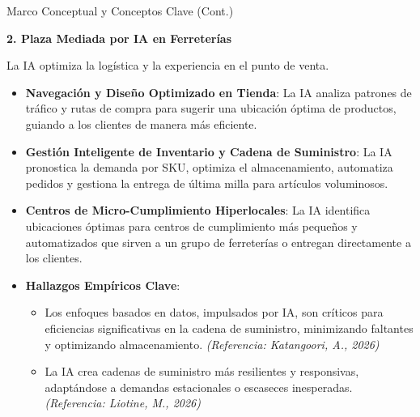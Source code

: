 \documentclass[aspectratio=169]{beamer}
\begin{document}
\begin{frame}{Marco Conceptual y Conceptos Clave (Cont.)}


\textbf{2. Plaza Mediada por IA en Ferreterías}

La IA optimiza la logística y la experiencia en el punto de venta.

\begin{itemize}
  \item \textbf{Navegación y Diseño Optimizado en Tienda}: La IA analiza patrones de tráfico y rutas de compra para sugerir una ubicación óptima de productos, guiando a los clientes de manera más eficiente.
  \item \textbf{Gestión Inteligente de Inventario y Cadena de Suministro}: La IA pronostica la demanda por SKU, optimiza el almacenamiento, automatiza pedidos y gestiona la entrega de última milla para artículos voluminosos.
  \item \textbf{Centros de Micro-Cumplimiento Hiperlocales}: La IA identifica ubicaciones óptimas para centros de cumplimiento más pequeños y automatizados que sirven a un grupo de ferreterías o entregan directamente a los clientes.
  \item \textbf{Hallazgos Empíricos Clave}:
  \begin{itemize}
    \item Los enfoques basados en datos, impulsados por IA, son críticos para eficiencias significativas en la cadena de suministro, minimizando faltantes y optimizando almacenamiento. \textit{(Referencia: Katangoori, A., 2026)}
    \item La IA crea cadenas de suministro más resilientes y responsivas, adaptándose a demandas estacionales o escaseces inesperadas. \textit{(Referencia: Liotine, M., 2026)}
  \end{itemize}
\end{itemize}
\end{frame}
\end{document}
